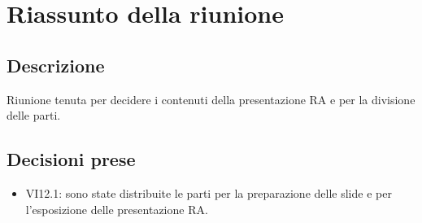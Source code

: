 \section{Riassunto della riunione}
\subsection{Descrizione}
Riunione tenuta per decidere i contenuti della presentazione RA e per la divisione delle parti.

\subsection{Decisioni prese}
\begin{itemize}
\item VI12.1: sono state distribuite le parti per la preparazione delle slide e per l'esposizione delle presentazione RA.
\end{itemize}
